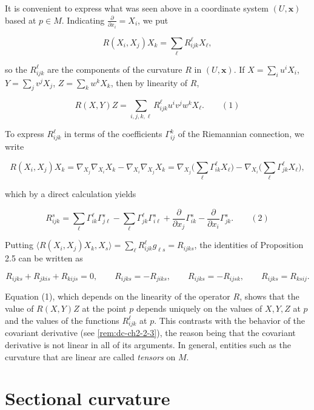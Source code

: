 \begin{remark}[Remark 2.6]
  \label{rem:dc-ch4-2-6}
  It is convenient to express what was seen above in a coordinate system $(U,\mathbf{x})$
  based at $p\in M$. Indicating $\frac{\partial}{\partial x_i}=X_i$, we put
  
  $$
  R(X_i,X_j)X_k=\sum_\ell R_{ijk}^\ell X_\ell,
  $$
  
  so the $R_{ijk}^\ell$ are the components of the curvature $R$ in $(U,\mathbf{x})$.
  If $X=\sum_i u^i X_i$, $Y=\sum_j v^j X_j$, $Z=\sum_k w^k X_k$, then by linearity of
  $R$,
  
  $$
  R(X,Y)Z=\sum_{i,j,k,\ell}R_{ijk}^\ell u^i v^j w^k X_\ell.\qquad(1)
  $$
  
  To express $R_{ijk}^\ell$ in terms of the coefficients $\Gamma_{ij}^k$ of the
  Riemannian connection, we write
  
  $$
  R(X_i,X_j)X_k=\nabla_{X_j}\nabla_{X_i}X_k-\nabla_{X_i}\nabla_{X_j}X_k=\nabla_{X_j}\Big(\sum_\ell\Gamma_{ik}^\ell X_\ell\Big)-\nabla_{X_i}\Big(\sum_\ell\Gamma_{jk}^\ell X_\ell\Big),
  $$
  
  which by a direct calculation yields
  
  $$
  R_{ijk}^s=\sum_\ell\Gamma_{ik}^\ell\Gamma_{j\ell}^s-\sum_\ell\Gamma_{jk}^\ell\Gamma_{i\ell}^s+\frac{\partial}{\partial x_j}\Gamma_{ik}^s-\frac{\partial}{\partial x_i}\Gamma_{jk}^s.\qquad(2)
  $$
  
  Putting $\langle R(X_i,X_j)X_k,X_s\rangle=\sum_\ell R_{ijk}^\ell g_{\ell s}=R_{ijks}$,
  the identities of Proposition 2.5 can be written as
  
  $$
  R_{ijks}+R_{jkis}+R_{kijs}=0,\qquad R_{ijks}=-R_{jiks},\qquad R_{ijks}=-R_{ijsk},\qquad R_{ijks}=R_{ksij}.
  $$
  
  Equation (1), which depends on the linearity of the operator $R$, shows that the
  value of $R(X,Y)Z$ at the point $p$ depends uniquely on the values of $X,Y,Z$ at
  $p$ and the values of the functions $R_{ijk}^\ell$ at $p$. This contrasts with the
  behavior of the covariant derivative (see \cref{rem:dc-ch2-2-3}), the reason
  being that the covariant derivative is not linear in all of its arguments. In
  general, entities such as the curvature that are linear are called \emph{tensors} on
  $M$.
\end{remark}

\section{Sectional curvature}

